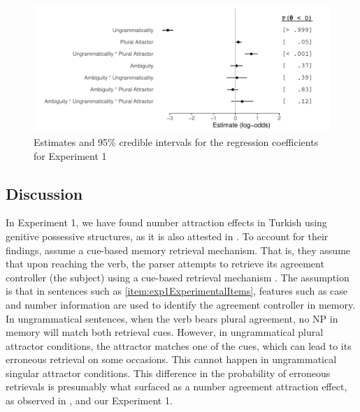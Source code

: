 \documentclass[doc,a4paper,man,natbib,floatsintext,noextraspace]{apa6}\usepackage[]{graphicx}\usepackage[]{color}
\makeatletter
\def\maxwidth{ %
  \ifdim\Gin@nat@width>\linewidth
    \linewidth
  \else
    \Gin@nat@width
  \fi
}
\newenvironment{knitrout}{}{} %
\makeatother
\begin{document}
\begin{knitrout}
\color{fgcolor}\begin{figure}

{\centering \includegraphics[width=\maxwidth]{figure/exp1ResponseModel-1} 

}

\caption[Estimates and 95\% credible intervals for the regression coefficients for Experiment 1]{Estimates and 95\% credible intervals for the regression coefficients for Experiment 1}\label{fig:exp1ResponseModel}
\end{figure}


\end{knitrout}



\subsection{Discussion} \label{sec:exp1:discussion}

In Experiment 1, we have found number attraction effects in Turkish using genitive possessive structures, as it is also attested in \citet{LagoEtAl:2018}. To account for their findings, \citet{LagoEtAl:2018} assume a cue-based memory retrieval mechanism. That is, they assume that upon reaching the verb, the parser attempts to retrieve its agreement controller (the subject) using a cue-based retrieval mechanism \citep{LewisVasishth:2005,JagerEngelmannVasishth:2017}. The assumption is that in sentences such as \ref{item:exp1ExperimentalItems}, features such as case and number information are used to identify the agreement controller in memory. In ungrammatical sentences, when the verb bears plural agreement, no NP in memory will match both retrieval cues. However, in ungrammatical plural attractor conditions, the attractor matches one of the cues, which can lead to its erroneous retrieval on some occasions. This cannot happen in ungrammatical singular attractor conditions. This difference in the probability of erroneous retrievals is presumably what surfaced as a number agreement attraction effect, as observed in \citet{LagoEtAl:2018}, and our Experiment 1.
\end{document}
